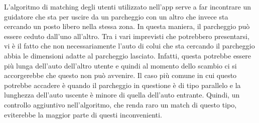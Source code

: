 L'algoritmo di matching degli utenti utilizzato nell'app serve a far incontrare un
guidatore che sta per uscire da un parcheggio con un altro che invece sta
cercando un posto libero nella stessa zona. In questa maniera, il parcheggio può
essere ceduto dall'uno all'altro. Tra i vari imprevisti che potrebbero presentarsi,
vi è il fatto che non necessariamente l'auto di colui che sta cercando il parcheggio 
abbia le dimensioni adatte al parcheggio lasciato. Infatti, questa potrebbe essere 
più lunga dell'auto dell'altro utente e quindi al momento dello scambio ci si 
accorgerebbe che questo non può avvenire. Il caso più comune in cui questo potrebbe
accadere è quando il parcheggio in questione è di tipo parallelo e la lunghezza
dell'auto uscente è minore di quella dell'auto entrante. Quindi, un controllo 
aggiuntivo nell'algoritmo, che renda raro un match di questo tipo, eviterebbe la
maggior parte di questi inconvenienti.